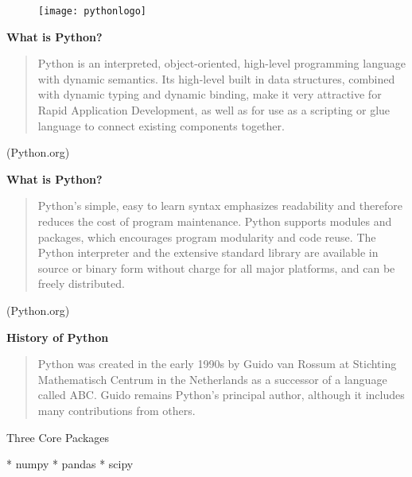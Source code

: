 \begin{figure}
\centering
\texttt{[image: pythonlogo]}

\end{figure}

	
	
	
	\textbf{What is Python?}
	\begin{quote}
		Python is an interpreted, object-oriented, high-level programming language with dynamic semantics. Its high-level built in data structures, combined with dynamic typing and dynamic binding, make it very attractive for Rapid Application Development, as well as for use as a scripting or glue language to connect existing components together. 
	\end{quote}
	
	(Python.org)
	

	
		
			\textbf{What is Python?}
		\begin{quote}
			Python's simple, easy to learn syntax emphasizes readability and therefore reduces the cost of program maintenance. Python supports modules and packages, which encourages program modularity and code reuse. The Python interpreter and the extensive standard library are available in source or binary form without charge for all major platforms, and can be freely distributed.
		\end{quote}
			(Python.org)
	

		
		\textbf{History of Python}
		\begin{quote}
	Python was created in the early 1990s by Guido van Rossum at Stichting Mathematisch Centrum in the Netherlands as a successor of a language called ABC. Guido remains Python’s principal author, although it includes many contributions from others.
	\end{quote}









	\huge
Three Core Packages
\begin{enumerate}
*   numpy
*   pandas
*   scipy
\end{enumerate}











